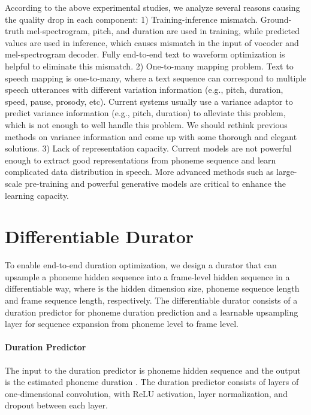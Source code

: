 \documentclass{article}
\theoremstyle{definition}
\begin{document}
According to the above experimental studies, we analyze several reasons causing the quality drop in each component: 1) Training-inference mismatch. Ground-truth mel-spectrogram, pitch, and duration are used in training, while predicted values are used in inference, which causes mismatch in the input of vocoder and mel-spectrogram decoder. Fully end-to-end text to waveform optimization is helpful to eliminate this mismatch. 2) One-to-many mapping problem. Text to speech mapping is one-to-many, where a text sequence can correspond to multiple speech utterances with different variation information (e.g., pitch, duration, speed, pause, prosody, etc). Current systems usually use a variance adaptor to predict variance information (e.g., pitch, duration) to alleviate this problem, which is not enough to well handle this problem. We should rethink previous methods on variance information and come up with some thorough and elegant solutions. 3) Lack of representation capacity. Current models are not powerful enough to extract good representations from phoneme sequence and learn complicated data distribution in speech. More advanced methods such as large-scale pre-training and powerful generative models are critical to enhance the learning capacity.  




\section{Differentiable Durator}
\label{appendix_durator}

To enable end-to-end duration optimization, we design a durator that can upsample a phoneme hidden sequence  into a frame-level hidden sequence  in a differentiable way, where  is the hidden dimension size, phoneme sequence length and frame sequence length, respectively.
The differentiable durator consists of a duration predictor  for phoneme duration prediction and a learnable upsampling layer  for sequence expansion from phoneme level to frame level. 


\paragraph{Duration Predictor}
The input to the duration predictor  is phoneme hidden sequence  and the output is the estimated phoneme duration . The duration predictor  consists of  layers of one-dimensional convolution, with ReLU activation, layer normalization, and dropout between each layer. 
\end{document}
